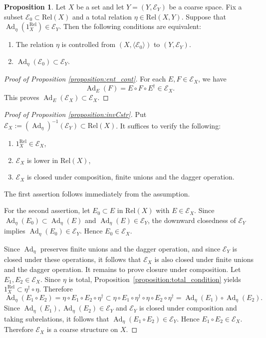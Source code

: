 \documentclass[12pt, a4paper]{amsart}
\theoremstyle{definition}
\newtheorem{proposition}[theorem]{Proposition}
\newcommand{\Ad}{\mathop{\mathrm{Ad}}\nolimits}
\newcommand{\Rel}{\mathrm{Rel}}
\begin{document}
\begin{proposition}\label{proposition:generator_controlled}
Let $X$ be a set and let $Y=(Y,\mathcal{E}_Y)$ be a coarse space.
Fix a subset $\mathcal{E}_0\subset\Rel(X)$ and a total relation
$\eta\in\Rel(X,Y)$.
Suppose that
$\Ad_\eta(1_X^\Rel)
\in
\mathcal{E}_Y$.
Then the following conditions are equivalent:
\begin{enumerate}
\item\label{proposition:generator_controlled_controlled}
The relation $\eta$ is controlled from
$(X,\langle\mathcal{E}_0\rangle)$
to
$(Y,\mathcal{E}_Y)$.
\item\label{proposition:generator_controlled_inclusion}
$\Ad_\eta(\mathcal{E}_0)
\subset
\mathcal{E}_Y$.
\end{enumerate}
\end{proposition}

\begin{proof}[Proof of Proposition \ref{proposition:ent_cont}]
For each $E,F \in \mathcal{E}_{X}$, 
we have 
\[
\Ad_{E}(F) = E \circ F \circ E^\dagger \in \mathcal{E}_X.
\]
This proves $\Ad_{E}(\mathcal{E}_X) \subset \mathcal{E}_X$.
\end{proof}

\begin{proof}[Proof of Proposition \ref{proposition:invCstr}]
Put $\mathcal{E}_X := (\Ad_\eta)^{-1}(\mathcal{E}_Y)\subset\Rel(X)$.
It suffices to verify the following:
\begin{enumerate}
    \item $1^\Rel_X \in \mathcal{E}_X$,
    \item $\mathcal{E}_X$ is lower in $\Rel(X)$,
    \item $\mathcal{E}_X$ is closed under composition, finite unions and the dagger operation.
\end{enumerate}

The first assertion follows immediately from the assumption.

For the second assertion, let $E_0 \subset E$ in $\Rel(X)$ with $E \in \mathcal{E}_X$.
Since $\Ad_\eta(E_0) \subset \Ad_\eta(E)$ and $\Ad_\eta(E) \in \mathcal{E}_Y$, the downward closedness of $\mathcal{E}_Y$ implies $\Ad_\eta(E_0) \in \mathcal{E}_Y$.
Hence $E_0 \in \mathcal{E}_X$.

Since $\Ad_\eta$ preserves finite unions and the dagger operation, and since $\mathcal{E}_Y$ is closed under these operations, it follows that $\mathcal{E}_X$ is also closed under finite unions and the dagger operation.
It remains to prove closure under composition.
Let $E_1,E_2\in\mathcal{E}_X$.
Since $\eta$ is total, Proposition~\ref{proposition:total_condition} yields
$1^\Rel_X\subset\eta^\dagger\circ\eta$.
Therefore
\[
\Ad_\eta(E_1\circ E_2)
=
\eta\circ E_1\circ E_2\circ\eta^\dagger
\subset
\eta\circ E_1\circ\eta^\dagger\circ\eta\circ E_2\circ\eta^\dagger
=
\Ad_\eta(E_1)\circ\Ad_\eta(E_2).
\]
Since $\Ad_\eta(E_1),\Ad_\eta(E_2)\in\mathcal{E}_Y$ and $\mathcal{E}_Y$ is closed under composition and taking subrelations, it follows that $\Ad_\eta(E_1\circ E_2)\in\mathcal{E}_Y$.
Hence $E_1\circ E_2\in\mathcal{E}_X$. 
Therefore $\mathcal{E}_X$ is a coarse structure on $X$.
\end{proof}
\end{document}
